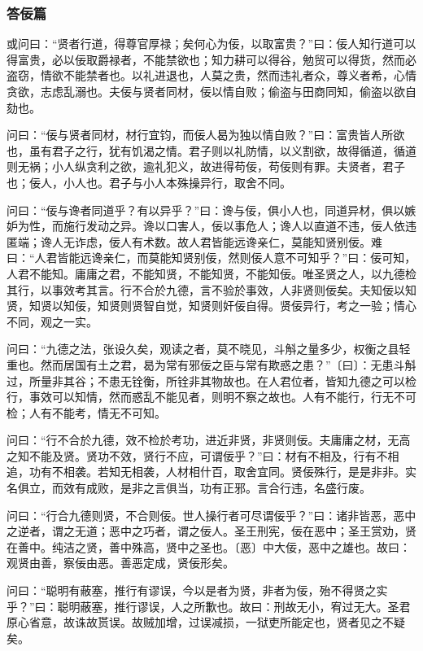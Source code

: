 \documentclass[]{article}
\begin{document}
\hypertarget{header-n505}{%
\subsubsection{答佞篇}\label{header-n505}}

或问曰：``贤者行道，得尊官厚禄；矣何心为佞，以取富贵？''曰：佞人知行道可以得富贵，必以佞取爵禄者，不能禁欲也；知力耕可以得谷，勉贸可以得货，然而必盗窃，情欲不能禁者也。以礼进退也，人莫之贵，然而违礼者众，尊义者希，心情贪欲，志虑乱溺也。夫佞与贤者同材，佞以情自败；偷盗与田商同知，偷盗以欲自劾也。

问曰：``佞与贤者同材，材行宜钧，而佞人曷为独以情自败？''曰：富贵皆人所欲也，虽有君子之行，犹有饥渴之情。君子则以礼防情，以义割欲，故得循道，循道则无祸；小人纵贪利之欲，逾礼犯义，故进得苟佞，苟佞则有罪。夫贤者，君子也；佞人，小人也。君子与小人本殊操异行，取舍不同。

问曰：``佞与谗者同道乎？有以异乎？''曰：谗与佞，俱小人也，同道异材，俱以嫉妒为性，而施行发动之异。谗以口害人，佞以事危人；谗人以直道不违，佞人依违匿端；谗人无诈虑，佞人有术数。故人君皆能远谗亲仁，莫能知贤别佞。难曰：``人君皆能远谗亲仁，而莫能知贤别佞，然则佞人意不可知乎？''曰：佞可知，人君不能知。庸庸之君，不能知贤，不能知贤，不能知佞。唯圣贤之人，以九德检其行，以事效考其言。行不合於九德，言不验於事效，人非贤则佞矣。夫知佞以知贤，知贤以知佞，知贤则贤智自觉，知贤则奸佞自得。贤佞异行，考之一验；情心不同，观之一实。

问曰：``九德之法，张设久矣，观读之者，莫不晓见，斗斛之量多少，权衡之县轻重也。然而居国有土之君，曷为常有邪佞之臣与常有欺惑之患？''〔曰〕：无患斗斛过，所量非其谷；不患无铨衡，所铨非其物故也。在人君位者，皆知九德之可以检行，事效可以知情，然而惑乱不能见者，则明不察之故也。人有不能行，行无不可检；人有不能考，情无不可知。

问曰：``行不合於九德，效不检於考功，进近非贤，非贤则佞。夫庸庸之材，无高之知不能及贤。贤功不效，贤行不应，可谓佞乎？''曰：材有不相及，行有不相追，功有不相袭。若知无相袭，人材相什百，取舍宜同。贤佞殊行，是是非非。实名俱立，而效有成败，是非之言俱当，功有正邪。言合行违，名盛行废。

问曰：``行合九德则贤，不合则佞。世人操行者可尽谓佞乎？''曰：诸非皆恶，恶中之逆者，谓之无道；恶中之巧者，谓之佞人。圣王刑宪，佞在恶中；圣王赏劝，贤在善中。纯洁之贤，善中殊高，贤中之圣也。〔恶〕中大佞，恶中之雄也。故曰：观贤由善，察佞由恶。善恶定成，贤佞形矣。

问曰：``聪明有蔽塞，推行有谬误，今以是者为贤，非者为佞，殆不得贤之实乎？''曰：聪明蔽塞，推行谬误，人之所歉也。故曰：刑故无小，宥过无大。圣君原心省意，故诛故贳误。故贼加增，过误减损，一狱吏所能定也，贤者见之不疑矣。
\end{document}
